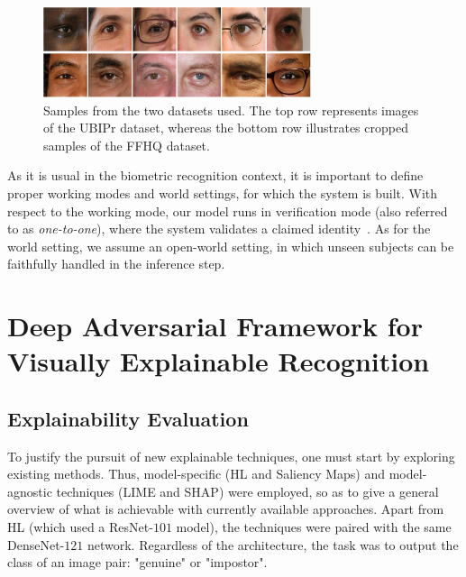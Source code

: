 \begin{figure}[H]
  \begin{center}
  \includegraphics[width=0.70\textwidth]{figures/figure_32.pdf}
  \caption{Samples from the two datasets used. The top row represents images of the \ac{UBIPr} dataset, whereas the bottom row illustrates cropped samples of the \ac{FFHQ} dataset.}
  \label{fig:dataset_samples}
  \end{center}
\end{figure}
 As it is usual in the biometric recognition context, it is important to define proper working modes and world settings, for which the system is built. With respect to the working mode, our model runs in verification mode (also referred to as \textit{one-to-one}), where the system validates a claimed identity~\cite{introduction_to_biometric_recognition}. As for the world setting, we assume an open-world setting, in which unseen subjects can be faithfully handled in the inference step.

\section{Deep Adversarial Framework for Visually Explainable Recognition}
\label{sec:chap4_method_a_results}

\subsection{Explainability Evaluation}
\label{subsec:chap4_explainability_evaluation}

To justify the pursuit of new explainable techniques, one must start by exploring existing methods. Thus, model-specific (HL and Saliency Maps) and model-agnostic techniques (\ac{LIME} and \ac{SHAP}) were employed, so as to give a general overview of what is achievable with currently available approaches. Apart from HL (which used a ResNet-$101$ model), the techniques were paired with the same DenseNet-$121$ network. Regardless of the architecture, the task was to output the class of an image pair: "genuine" or "impostor".

